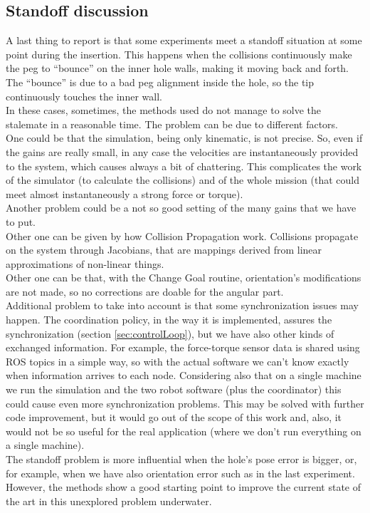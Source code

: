 \subsection{Standoff discussion}
A last thing to report is that some experiments meet a standoff situation at some point during the insertion. This happens when the collisions continuously make the peg to \enquote{bounce} on the inner hole walls, making it moving back and forth. The \enquote{bounce} is due to a bad peg alignment inside the hole, so the tip continuously touches the inner wall.\\

In these cases, sometimes, the methods used do not manage to solve the stalemate in a reasonable time. The problem can be due to different factors.\\
One could be that the simulation, being only kinematic, is not precise. So, even if the gains are really small, in any case the velocities are instantaneously provided to the system, which causes always a bit of chattering. This complicates the work of the simulator (to calculate the collisions) and of the whole mission (that could meet almost instantaneously a strong force or torque).\\
Another problem could be a not so good setting of the many gains that we have to put.\\ Other one can be given by how Collision Propagation work. Collisions propagate on the system through Jacobians, that are mappings derived from linear approximations of non-linear things.\\ 
Other one can be that, with the Change Goal routine, orientation's modifications are not made, so no corrections are doable for the angular part.\\
Additional problem to take into account is that some synchronization issues may happen. The coordination policy, in the way it is implemented, assures the synchronization (section \ref{sec:controlLoop}), but we have also other kinds of exchanged information. For example, the force-torque sensor data is shared using ROS topics in a simple way, so with the actual software we can't know exactly when information arrives to each node. Considering also that on a single machine we run the simulation and the two robot software (plus the coordinator) this could cause even more synchronization problems. This may be solved with further code improvement, but it would go out of the scope of this work and, also, it would not be so useful for the real application (where we don't run everything on a single machine).\\

The standoff problem is more influential when the hole's pose error is bigger, or, for example, when we have also orientation error such as in the last experiment. However, the methods show a good starting point to improve the current state of the art in this unexplored problem underwater.
